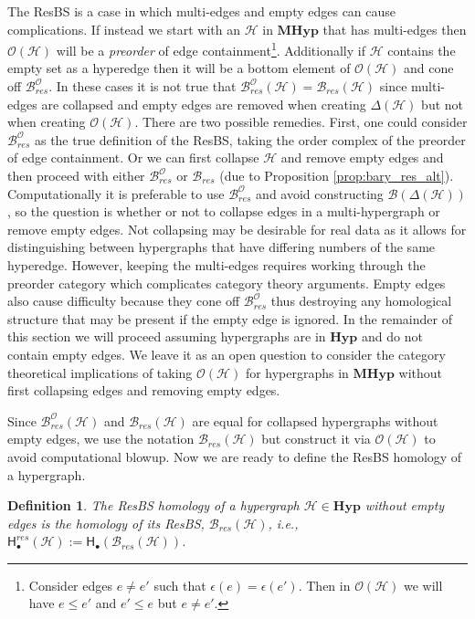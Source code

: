 \documentclass{amsart}
\newtheorem{definition}[theorem]{Definition}
\newcommand{\Hyp}{\mathrm{\textbf{Hyp}}}
\newcommand{\MHyp}{\mathrm{\textbf{MHyp}}}
\newcommand{\Hgroup}	     {\mathsf{H}}
\renewcommand{\hom}[2]{\Hgroup_{#2}^{#1}}
\renewcommand{\H}{\mathcal{H}}
\newcommand{\bary}{\mathcal{B}}
\newcommand{\ECP}{\mathcal{O}}
\begin{document}
The ResBS is a case in which multi-edges and empty edges can cause complications.
If instead we start with an $\H$ in $\MHyp$ that has multi-edges then $\ECP(\H)$ will be a \emph{preorder} of edge containment\footnote{Consider edges $e\neq e'$ such that $\epsilon(e) = \epsilon(e')$. Then in $\ECP(\H)$ we will have $e \leq e'$ and $e' \leq e$ but $e \neq e'$.}. Additionally if $\H$ contains the empty set as a hyperedge then it will be a bottom element of $\ECP(\H)$ and cone off $\bary_{res}^\ECP$. In these cases it is not true that $\bary_{res}^\ECP(\H) = \bary_{res}(\H)$ since multi-edges are collapsed and empty edges are removed when creating $\Delta(\H)$ but not when creating $\ECP(\H)$. 
There are two possible remedies. First, one could consider $\bary_{res}^\ECP$ as the true definition of the ResBS, taking the order complex of the preorder of edge containment. Or we can first collapse $\H$ and remove empty edges and then proceed with either $\bary_{res}^\ECP$ or $\bary_{res}$ (due to Proposition \ref{prop:bary_res_alt}). 
Computationally it is preferable to use $\bary_{res}^\ECP$ and avoid constructing $\bary(\Delta(\H))$, so the question is whether or not to collapse edges in a multi-hypergraph or remove empty edges. 
Not collapsing may be desirable for real data as it allows for distinguishing between hypergraphs that have differing numbers of the same hyperedge. However, keeping the multi-edges requires working through the preorder category which complicates category theory arguments.
Empty edges also cause difficulty because they cone off $\bary_{res}^\ECP$ thus destroying any homological structure that may be present if the empty edge is ignored.
In the remainder of this section we will proceed assuming hypergraphs are in $\Hyp$ and do not contain empty edges. We leave it as an open question to consider the category theoretical implications of taking $\ECP(\H)$ for hypergraphs in $\MHyp$ without first collapsing edges and removing empty edges.

Since $\bary_{res}^\ECP(\H)$ and $\bary_{res}(\H)$ are equal for collapsed hypergraphs without empty edges, we use the notation $\bary_{res}(\H)$ but construct it via $\ECP(\H)$ to avoid computational blowup. 
Now we are ready to define the ResBS homology of a hypergraph.

\begin{definition}
The \emph{ResBS homology} of a hypergraph $\H \in \Hyp$ without empty edges is the homology of its ResBS, $\bary_{res}(\H)$,  i.e., $\hom{res}{\bullet}(\H) := \hom{}{\bullet}(\bary_{res}(\H))$.
\end{definition}
\end{document}
